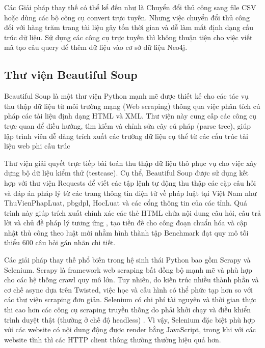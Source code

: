 \documentclass[../DoAn.tex]{subfiles}
\begin{document}
Các Giải pháp thay thế có thể kể đến như là Chuyển đổi thủ công sang file CSV hoặc dùng các bộ công cụ convert trực tuyến. Nhưng việc chuyển đổi thủ công đối với hàng trăm trang tài liệu gây tốn thời gian và dễ làm mất định dạng cấu trúc dữ liệu. Sử dụng các công cụ trực tuyến thì không thuận tiện cho việc viết mã tạo câu query để thêm dữ liệu vào cơ sở dữ liệu Neo4j.


\subsection{Thư viện Beautiful Soup}
\label{subsection:3.3.3}


Beautiful Soup \cite{BeautifulSoupDoc} là một thư viện Python mạnh mẽ được thiết kế cho các tác vụ thu thập dữ liệu từ môi trường mạng (Web scraping) thông qua việc phân tích cú pháp các tài liệu định dạng HTML và XML. Thư viện này cung cấp các công cụ trực quan để điều hướng, tìm kiếm và chỉnh sửa cây cú pháp (parse tree), giúp lập trình viên dễ dàng trích xuất các trường dữ liệu cụ thể từ các cấu trúc tài liệu web phi cấu trúc


Thư viện giải quyết trực tiếp bài toán thu thập dữ liệu thô phục vụ cho việc xây dựng bộ dữ liệu kiểm thử (testcase). Cụ thể, Beautiful Soup được sử dụng kết hợp với thư viện Requests để viết các tập lệnh tự động thu thập các cặp câu hỏi và đáp án pháp lý từ các trang thông tin điện tử về pháp luật tại Việt Nam như ThuVienPhapLuat, pbgdpl, HocLuat và các cổng thông tin của các tỉnh. Quá trình này giúp trích xuất chính xác các thẻ HTML chứa nội dung câu hỏi, câu trả lời và chủ đề pháp lý tương ứng , tạo tiền đề cho công đoạn chuẩn hóa và cập nhật thủ công theo luật mới nhằm hình thành tập Benchmark đạt quy mô tối thiểu 600 câu hỏi gán nhãn chi tiết.  


Các giải pháp thay thế phổ biến trong hệ sinh thái Python bao gồm Scrapy và Selenium. Scrapy là framework web scraping bất đồng bộ mạnh mẽ và phù hợp cho các hệ thống crawl quy mô lớn. Tuy nhiên, do kiến trúc nhiều thành phần và cơ chế async dựa trên Twisted, việc học và cấu hình có thể phức tạp hơn so với các thư viện scraping đơn giản. Selenium có chi phí tài nguyên và thời gian thực thi cao hơn các công cụ scraping truyền thống do phải khởi chạy và điều khiển trình duyệt thật (thường ở chế độ headless) \cite{GARCIA2026108077}. Vì vậy, Selenium đặc biệt phù hợp với các website có nội dung động được render bằng JavaScript, trong khi với các website tĩnh thì các HTTP client thông thường thường hiệu quả hơn.
\end{document}
